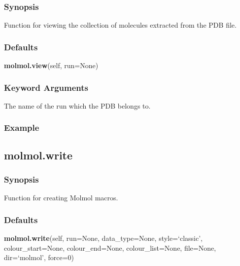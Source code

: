   
 \subsubsection{Synopsis} 

 Function for viewing the collection of molecules extracted from the PDB file. 
  

  
 \subsubsection{Defaults} 

 \textsf{\textbf{molmol.view}(self, run=None)} 

  
 \subsubsection{Keyword Arguments} 

   The name of the run which the PDB belongs to.  

  

  
 \subsubsection{Example} 



  

 \newpage 

 \subsection{molmol.write} 

  
 \subsubsection{Synopsis} 

 Function for creating Molmol macros. 
  

  
 \subsubsection{Defaults} 

 \textsf{\textbf{molmol.write}(self, run=None, data\_type=None, style=`classic', colour\_start=None, colour\_end=None, colour\_list=None, file=None, dir=`molmol', force=0)} 


